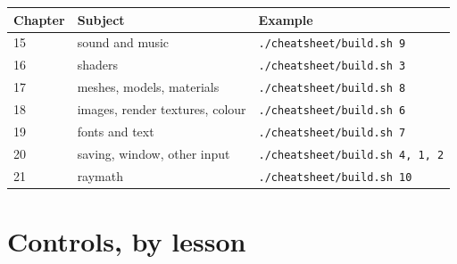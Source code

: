 \begin{center}
\begin{tabular}{@{}lll@{}}
\toprule
\textbf{Chapter} & \textbf{Subject} & \textbf{Example} \\
\midrule
15 & sound and music & \lstinline|./cheatsheet/build.sh 9| \\
16 & shaders & \lstinline|./cheatsheet/build.sh 3| \\
17 & meshes, models, materials & \lstinline|./cheatsheet/build.sh 8| \\
18 & images, render textures, colour & \lstinline|./cheatsheet/build.sh 6| \\
19 & fonts and text & \lstinline|./cheatsheet/build.sh 7| \\
20 & saving, window, other input & \lstinline|./cheatsheet/build.sh 4, 1, 2| \\
21 & raymath & \lstinline|./cheatsheet/build.sh 10| \\
\bottomrule
\end{tabular}
\end{center}

\section{Controls, by lesson}

